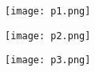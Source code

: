 ﻿\documentclass[11pt,onecolumn,landscape]{article}
\begin{document}
\begin{center}
\texttt{[image: p1.png]}
\end{center}

\begin{center}
\texttt{[image: p2.png]}
\end{center}

\begin{center}
\texttt{[image: p3.png]}
\end{center}
\end{document}
